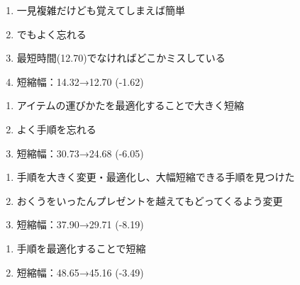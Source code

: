 \clearpage
\begin{enumerate}[label={\sarrow}]
\item 一見複雑だけども覚えてしまえば簡単
\item でもよく忘れる
\item 最短時間(12.70)でなければどこかミスしている
\item 短縮幅：14.32→12.70 (-1.62)
\end{enumerate}



\begin{enumerate}[label={\sarrow}]
\item アイテムの運びかたを最適化することで大きく短縮
\item よく手順を忘れる
\item 短縮幅：30.73→24.68 (-6.05)
\end{enumerate}



\begin{enumerate}[label={\sarrow}]
\item 手順を大きく変更・最適化し、大幅短縮できる手順を見つけた
\item おくうをいったんプレゼントを越えてもどってくるよう変更
\item 短縮幅：37.90→29.71 (-8.19)
\end{enumerate}



\begin{enumerate}[label={\sarrow}]
\item 手順を最適化することで短縮
\item 短縮幅：48.65→45.16 (-3.49)
\end{enumerate}





